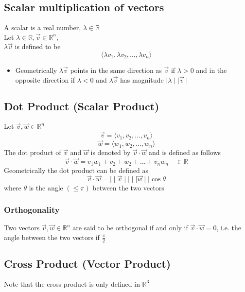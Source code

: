 \documentclass{article}
\begin{document}
\subsection*{Scalar multiplication of vectors}
A scalar is a real number, $\lambda \in \mathbb{R}$
\\
Let $\lambda \in \mathbb{R}, \vec{v} \in \mathbb{R}^n$,
\\
$\lambda\vec{v}$ is defined to be
\[
    \langle \lambda v_1, \lambda v_2, \dots , \lambda v_n \rangle
\]
\begin{itemize}
\item Geometrically $\lambda\vec{v}$ points in the same direction as $\vec{v}$ if $\lambda > 0 $ and
in the opposite direction if \(\lambda < 0\) and \(\lambda\vec{v}\) has magnitude \(\mid\lambda\mid\mid\vec{v}\mid\)
\end{itemize}

\subsection*{Dot Product (Scalar Product)}
Let \(\vec{v}, \vec{w} \in \mathbb{R}^n\)
\[
    \vec{v} = \langle v_1, v_2, \dots , v_n \rangle
\]
\[
    \vec{w} = \langle w_1, w_2, \dots , w_n \rangle
\]
The dot product of \(\vec{v}\) and \(\vec{w}\) is denoted by \(\vec{v}\cdot\vec{w}\)
and is defined as follows
\[
\vec{v}\cdot\vec{w} = v_1w_1 + v_2+w_2+\dots +v_nw_n \quad \in \mathbb{R}
\]
Geometrically the dot product can be defined as
\[
\vec{v} \cdot \vec{w} = \mid\mid\vec{v}\mid\mid \mid\mid\vec{w}\mid\mid \cos \theta
\]
where \(\theta\) is the angle \((\leq\pi)\) between the two vectors
\subsubsection*{Orthogonality}
Two vectors \(\vec{v}, \vec{w} \in \mathbb{R}^n\) are said to be orthogonal if and only if
\(\vec{v} \cdot \vec{w} = 0\), i.e. the angle between the two vectors if \(\frac{\pi}{2}\)

\subsection*{Cross Product (Vector Product)}
Note that the cross product is only defined in \(\mathbb{R}^3\)
\end{document}
